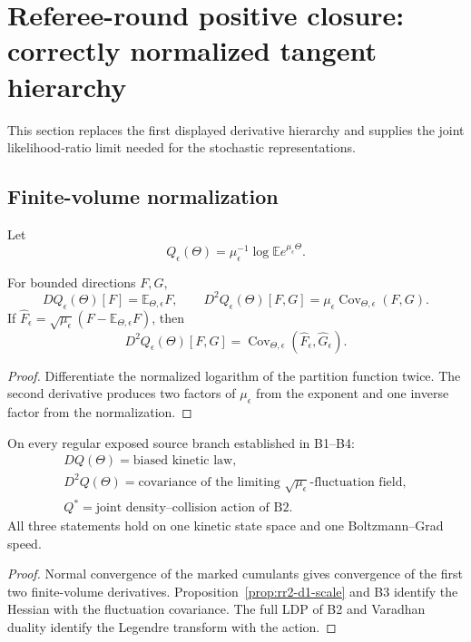 \section{Referee-round positive closure: correctly normalized tangent hierarchy}
\label{sec:rr2-d1}

This section replaces the first displayed derivative hierarchy and supplies
the joint likelihood-ratio limit needed for the stochastic representations.

\subsection{Finite-volume normalization}

Let
\[
 Q_\epsilon(\Theta)
 =
 \mu_\epsilon^{-1}\log
 \mathbb E e^{\mu_\epsilon\Theta}.
\]

\begin{proposition}
\label{prop:rr2-d1-scale}
For bounded directions \(F,G\),
\[
 DQ_\epsilon(\Theta)[F]
 =
 \mathbb E_{\Theta,\epsilon}F,
 \qquad
 D^2Q_\epsilon(\Theta)[F,G]
 =
 \mu_\epsilon
 \operatorname{Cov}_{\Theta,\epsilon}(F,G).
\]
If
\(\widehat F_\epsilon=\sqrt{\mu_\epsilon}
(F-\mathbb E_{\Theta,\epsilon}F)\), then
\[
 D^2Q_\epsilon(\Theta)[F,G]
 =
 \operatorname{Cov}_{\Theta,\epsilon}
 (\widehat F_\epsilon,\widehat G_\epsilon).
\]
\end{proposition}

\begin{proof}
Differentiate the normalized logarithm of the partition function twice.
The second derivative produces two factors of \(\mu_\epsilon\) from the
exponent and one inverse factor from the normalization.
\end{proof}

\begin{theorem}
\label{thm:rr2-d1-triangle}
On every regular exposed source branch established in B1--B4:
\[
 \begin{array}{c}
 DQ(\Theta)=\text{biased kinetic law},\\
 D^2Q(\Theta)=\text{covariance of the limiting }
 \sqrt{\mu_\epsilon}\text{-fluctuation field},\\
 Q^*=\text{joint density--collision action of B2}.
 \end{array}
\]
All three statements hold on one kinetic state space and one
Boltzmann--Grad speed.
\end{theorem}

\begin{proof}
Normal convergence of the marked cumulants gives convergence of the first
two finite-volume derivatives.  Proposition~\ref{prop:rr2-d1-scale} and B3
identify the Hessian with the fluctuation covariance.  The full LDP of B2
and Varadhan duality identify the Legendre transform with the action.
\end{proof}

